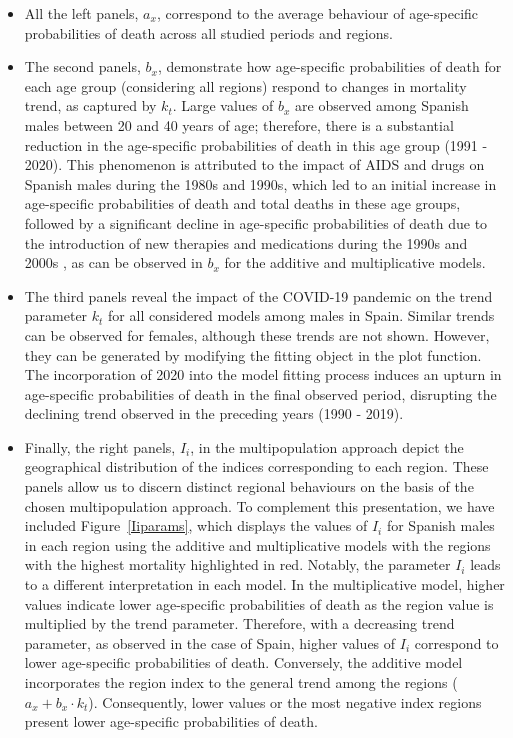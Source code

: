 \begin{itemize}
\item All the left panels, $a_x$, correspond to the average behaviour of age-specific probabilities of death across all studied periods and regions.
\item The second panels, $b_x$, demonstrate how age-specific probabilities of death for each age group (considering all regions) respond to changes in mortality trend, as captured by $k_t$. Large values of $b_x$ are observed among Spanish males between 20 and 40 years of age; therefore, there is a substantial reduction in the age-specific probabilities of death in this age group (1991 - 2020). This phenomenon is attributed to the impact of AIDS and drugs on Spanish males during the 1980s and 1990s, which led to an initial increase in age-specific probabilities of death and total deaths in these age groups, followed by a significant decline in age-specific probabilities of death due to the introduction of new therapies and medications during the 1990s and 2000s \citep{Felipe2002, Debon2008modelling, Atance2020const}, as can be observed in $b_{x}$ for the additive and multiplicative models.
\item The third panels reveal the impact of the COVID-19 pandemic on the trend parameter $k_t$ for all considered models among males in Spain. Similar trends can be observed for females, although these trends are not shown. However, they can be generated by modifying the fitting object in the plot function. The incorporation of 2020 into the model fitting process induces an upturn in age-specific probabilities of death in the final observed period, disrupting the declining trend observed in the preceding years (1990 - 2019).
\item Finally, the right panels, $I_i$, in the multipopulation approach depict the geographical distribution of the indices corresponding to each region. These panels allow us to discern distinct regional behaviours on the basis of the chosen multipopulation approach. To complement this presentation, we have included Figure~\ref{Iiparams}, which displays the values of $I_i$ for Spanish males in each region using the additive and multiplicative models with the regions with the highest mortality highlighted in red. Notably, the parameter $I_i$ leads to a different interpretation in each model. In the multiplicative model, higher values indicate lower age-specific probabilities of death as the region value is multiplied by the trend parameter. Therefore, with a decreasing trend parameter, as observed in the case of Spain, higher values of $I_i$ correspond to lower age-specific probabilities of death. Conversely, the additive model incorporates the region index to the general trend among the regions ($a_x + b_x \cdot k_t$). Consequently, lower values or the most negative index regions present lower age-specific probabilities of death.
\end{itemize}


